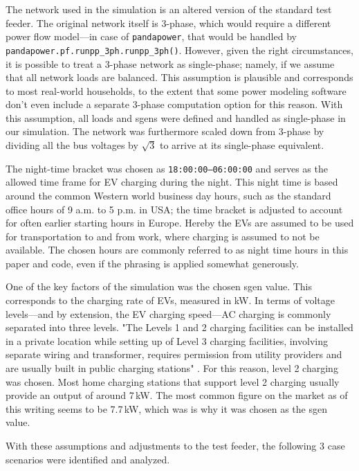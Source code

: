 \documentclass[a4paper,10pt]{report}
\begin{document}
The network used in the simulation is an altered version of the standard test feeder. The original network itself is 3-phase, which would require a different power flow model---in case of \texttt{pandapower}, that would be handled by \texttt{pandapower.pf.runpp\_3ph.runpp\_3ph()}. However, given the right circumstances, it is possible to treat a 3-phase network as single-phase; namely, if we assume that all network loads are balanced. This assumption is plausible and corresponds to most real-world households, to the extent that some power modeling software don't even include a separate 3-phase computation option for this reason. With this assumption, all loads and sgens were defined and handled as single-phase in our simulation. The network was furthermore scaled down from 3-phase by dividing all the bus voltages by $\sqrt{3}$ to arrive at its single-phase equivalent.

The night-time bracket was chosen as \texttt{18:00:00--06:00:00} and serves as the allowed time frame for EV charging during the night. This night time is based around the common Western world business day hours, such as the standard office hours of 9 a.m. to 5 p.m. in USA; the time bracket is adjusted to account for often earlier starting hours in Europe. Hereby the EVs are assumed to be used for transportation to and from work, where charging is assumed to not be available. The chosen hours are commonly referred to as night time hours in this paper and code, even if the phrasing is applied somewhat generously.

One of the key factors of the simulation was the chosen sgen value. This corresponds to the charging rate of EVs, measured in kW. In terms of voltage levels---and by extension, the EV charging speed---AC charging is commonly separated into three levels. "The Levels 1 and 2 charging facilities can be installed in a private location while setting up of Level 3 charging facilities, involving separate wiring and transformer, requires permission from utility providers and are usually built in public charging stations" \cite{Das2020}. For this reason, level 2 charging was chosen. Most home charging stations that support level 2 charging usually provide an output of around 7\,kW. The most common figure on the market as of this writing seems to be 7.7\,kW, which was is why it was chosen as the sgen value.

With these assumptions and adjustments to the test feeder, the following 3 case scenarios were identified and analyzed.
\end{document}
